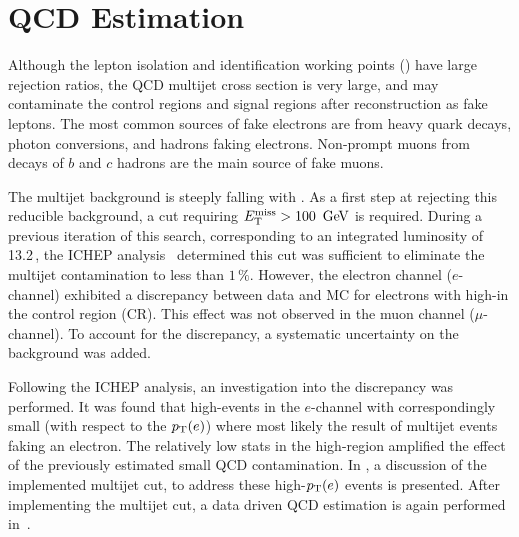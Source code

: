 \chapter{QCD Estimation}
\label{ch:qcd}

Although the lepton isolation and identification working points (\Ch{\ref{ch:objreco}}) have large rejection ratios, the QCD multijet cross section is very large, and may contaminate the control regions and signal regions after reconstruction as fake leptons. The most common sources of fake electrons are from heavy quark decays, photon conversions, and hadrons faking electrons. Non-prompt muons from decays of $b$ and $c$ hadrons are the main source of fake muons. 

The multijet background is steeply falling with \MET. As a first step at rejecting this reducible background, a cut requiring $\MET>100\,\GeV$ is required. During a previous iteration of this search, corresponding to an integrated luminosity of 13.2\,\ifb, the ICHEP analysis~\cite{ichep2016supportnote} determined this cut was sufficient to eliminate the multijet contamination to less than $1\,\%$.  However, the electron channel ($e$-channel) exhibited a discrepancy between data and MC for electrons with high-\pT in the \Wjets control region (CR). This effect was not observed in the muon channel ($\mu$-channel). To account for the discrepancy, a systematic uncertainty on the \Wjets background was added.

Following the ICHEP analysis, an investigation into the discrepancy was performed. It was found that high-\pT events in the $e$-channel with correspondingly small \MET (with respect to the $p_{\text{T}}(e)$) where most likely the result of multijet events faking an electron. The relatively low stats in the high-\pT region amplified the effect of the previously estimated small QCD contamination. In \Sect{\ref{ch:qcd:mjcut}}, a discussion of the implemented multijet cut, to address these high-$p_{\text{T}}(e)$ events is presented. After implementing the multijet cut, a data driven QCD estimation is again performed in~\Sect{\ref{ch:qcd:est}}.

%
